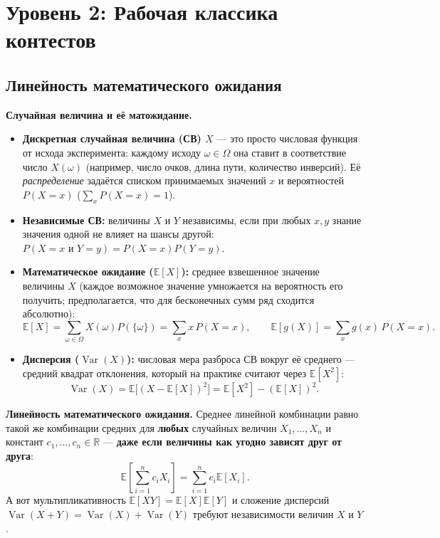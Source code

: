 \documentclass[10pt,a4paper]{article}
\newcommand{\R}{\mathbb{R}}
\newcommand{\E}{\mathbb{E}}
\newcommand{\Var}{\operatorname{Var}}
\begin{document}
\section{Уровень 2: Рабочая классика контестов}

\subsection{Линейность математического ожидания}

\textbf{Случайная величина и её матожидание.}
\begin{itemize}
  \item \textbf{Дискретная случайная величина (СВ) $X$} — это просто числовая функция от исхода эксперимента: каждому исходу $\omega \in \Omega$ она ставит в соответствие число $X(\omega)$ (например, число очков, длина пути, количество инверсий). Её \emph{распределение} задаётся списком принимаемых значений $x$ и вероятностей $P(X = x)$ ($\sum_x P(X = x) = 1$).
  \item \textbf{Независимые СВ:} величины $X$ и $Y$ независимы, если при любых $x, y$ знание значения одной не влияет на шансы другой: $P(X = x \text{ и } Y = y) = P(X = x) P(Y = y)$.
  \item \textbf{Математическое ожидание ($\E[X]$):} среднее взвешенное значение величины $X$ (каждое возможное значение умножается на вероятность его получить; предполагается, что для бесконечных сумм ряд сходится абсолютно):
  \[
    \E[X] = \sum_{\omega \in \Omega} X(\omega) P(\{\omega\}) = \sum_{x} x \, P(X = x), \qquad
    \E[g(X)] = \sum_{x} g(x) \, P(X = x).
  \]
  \item \textbf{Дисперсия ($\Var(X)$):} числовая мера разброса СВ вокруг её среднего — средний квадрат отклонения, который на практике считают через $\E[X^2]$:
  \[
    \Var(X) = \E\bigl[(X - \E[X])^2\bigr] = \E[X^2] - (\E[X])^2.
  \]
\end{itemize}

\textbf{Линейность математического ожидания.} Среднее линейной комбинации равно такой же комбинации средних для \textbf{любых} случайных величин $X_1, \dots, X_n$ и констант $c_1, \dots, c_n \in \R$ — \textbf{даже если величины как угодно зависят друг от друга}:
\[
  \E\!\left[\sum_{i=1}^{n} c_i X_i\right] = \sum_{i=1}^{n} c_i \E[X_i].
\]
А вот мультипликативность $\E[XY] = \E[X]\E[Y]$ и сложение дисперсий $\Var(X + Y) = \Var(X) + \Var(Y)$ требуют независимости величин $X$ и $Y$.
\end{document}
